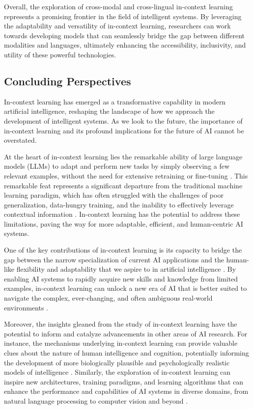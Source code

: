 \documentclass[11pt]{article}
\begin{document}
Overall, the exploration of cross-modal and cross-lingual in-context learning represents a promising frontier in the field of intelligent systems. By leveraging the adaptability and versatility of in-context learning, researchers can work towards developing models that can seamlessly bridge the gap between different modalities and languages, ultimately enhancing the accessibility, inclusivity, and utility of these powerful technologies.

\subsection{Concluding Perspectives}

In-context learning has emerged as a transformative capability in modern artificial intelligence, reshaping the landscape of how we approach the development of intelligent systems. As we look to the future, the importance of in-context learning and its profound implications for the future of AI cannot be overstated.

At the heart of in-context learning lies the remarkable ability of large language models (LLMs) to adapt and perform new tasks by simply observing a few relevant examples, without the need for extensive retraining or fine-tuning \cite{ref310,ref350}. This remarkable feat represents a significant departure from the traditional machine learning paradigm, which has often struggled with the challenges of poor generalization, data-hungry training, and the inability to effectively leverage contextual information \cite{ref374}. In-context learning has the potential to address these limitations, paving the way for more adaptable, efficient, and human-centric AI systems.

One of the key contributions of in-context learning is its capacity to bridge the gap between the narrow specialization of current AI applications and the human-like flexibility and adaptability that we aspire to in artificial intelligence \cite{ref375,ref376}. By enabling AI systems to rapidly acquire new skills and knowledge from limited examples, in-context learning can unlock a new era of AI that is better suited to navigate the complex, ever-changing, and often ambiguous real-world environments \cite{ref377}.

Moreover, the insights gleaned from the study of in-context learning have the potential to inform and catalyze advancements in other areas of AI research. For instance, the mechanisms underlying in-context learning can provide valuable clues about the nature of human intelligence and cognition, potentially informing the development of more biologically plausible and psychologically realistic models of intelligence \cite{ref378}. Similarly, the exploration of in-context learning can inspire new architectures, training paradigms, and learning algorithms that can enhance the performance and capabilities of AI systems in diverse domains, from natural language processing to computer vision and beyond \cite{ref379,ref380}.
\end{document}
